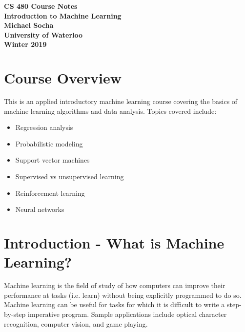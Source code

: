\documentclass[12pt,titlepage]{article}
\let\stdsection\section
\renewcommand\section{\clearpage\stdsection}
\begin{document}
  \begin{titlepage}
    \vspace*{\fill}
    \centering

    \textbf{\Huge CS 480 Course Notes} \\ [0.4em]
    \textbf{\Large Introduction to Machine Learning} \\ [1em]
    \textbf{\Large Michael Socha} \\ [1em]
    \textbf{\large University of Waterloo} \\
    \textbf{\large Winter 2019} \\
    \vspace*{\fill}
  \end{titlepage}

  \newpage 


  \tableofcontents

  \newpage


  \section{Course Overview}
    This is an applied introductory machine learning course covering the basics of machine learning algorithms and data analysis.
    Topics covered include:
    \begin{itemize}
      \item Regression analysis
      \item Probabilistic modeling
      \item Support vector machines
      \item Supervised vs unsupervised learning
      \item Reinforcement learning
      \item Neural networks
    \end{itemize}

  \section{Introduction - What is Machine Learning?}
    Machine learning is the field of study of how computers can improve their performance at tasks (i.e. learn) without being explicitly
    programmed to do so. Machine learning can be useful for tasks for which it is difficult to write a step-by-step imperative program.
    Sample applications include optical character recognition, computer vision, and game playing.
\end{document}
